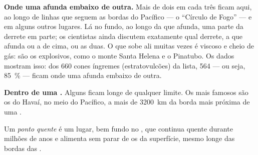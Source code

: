 \textbf{Onde uma  afunda embaixo de outra.} Mais de dois  em
cada três ficam aqui, ao longo de linhas que seguem as bordas do 
Pacífico --- o ``Círculo de Fogo'' --- e em alguns outros lugares. Lá no
fundo, ao longo da  que afunda, uma parte da  derrete em parte;
os cientistas ainda discutem exatamente qual  derrete, a  que
afunda ou a  de cima, ou as duas. O  que sobe ali muitas vezes é
viscoso e cheio de gás: são os  explosivos, como o monte Santa
Helena e o Pinatubo. Os dados mostram isso: dos 660 cones íngremes
(estratovulcões) da lista, 564 --- ou seja, 85~\% --- ficam onde uma 
afunda embaixo de outra.

\textbf{Dentro de uma .} Alguns  ficam longe de qualquer
limite. Os mais famosos são os do Havaí, no meio do  Pacífico, a mais
de \qty{3200}{km} da borda mais próxima de uma .

\begin{definition}\label{def:g7:volcanoes:hotspot}
Um \emph{ponto quente} é um lugar, bem fundo no , que
continua quente durante milhões de anos e alimenta sem parar de  os
 da superfície, mesmo longe das bordas das .
\end{definition}

